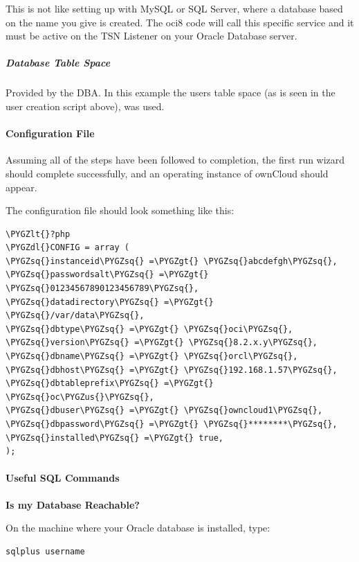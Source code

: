 \documentclass[letterpaper,10pt,english]{sphinxmanual}
\def\PYGZus{\char`\_}
\def\PYGZlt{\char`\<}
\def\PYGZgt{\char`\>}
\def\PYGZdl{\char`\$}
\def\PYGZsq{\char`\'}
\begin{document}
This is not like setting up with MySQL or SQL Server, where a database based on the name you give is created.
The oci8 code will call this specific service and it must be active on the TSN Listener on your Oracle Database server.


\subparagraph{Database Table Space}
\label{enterprise_installation/oracle_db_configuration:database-table-space}
Provided by the DBA.
In this example the users table space (as is seen in the user creation script above), was used.


\paragraph{Configuration File}
\label{enterprise_installation/oracle_db_configuration:configuration-file}
Assuming all of the steps have been followed to completion, the first run wizard should complete successfully, and an operating instance of ownCloud should appear.

The configuration file should look something like this:

\begin{Verbatim}[commandchars=\\\{\}]
\PYGZlt{}?php
\PYGZdl{}CONFIG = array (
\PYGZsq{}instanceid\PYGZsq{} =\PYGZgt{} \PYGZsq{}abcdefgh\PYGZsq{},
\PYGZsq{}passwordsalt\PYGZsq{} =\PYGZgt{} \PYGZsq{}01234567890123456789\PYGZsq{},
\PYGZsq{}datadirectory\PYGZsq{} =\PYGZgt{} \PYGZsq{}/var/data\PYGZsq{},
\PYGZsq{}dbtype\PYGZsq{} =\PYGZgt{} \PYGZsq{}oci\PYGZsq{},
\PYGZsq{}version\PYGZsq{} =\PYGZgt{} \PYGZsq{}8.2.x.y\PYGZsq{},
\PYGZsq{}dbname\PYGZsq{} =\PYGZgt{} \PYGZsq{}orcl\PYGZsq{},
\PYGZsq{}dbhost\PYGZsq{} =\PYGZgt{} \PYGZsq{}192.168.1.57\PYGZsq{},
\PYGZsq{}dbtableprefix\PYGZsq{} =\PYGZgt{} \PYGZsq{}oc\PYGZus{}\PYGZsq{},
\PYGZsq{}dbuser\PYGZsq{} =\PYGZgt{} \PYGZsq{}owncloud1\PYGZsq{},
\PYGZsq{}dbpassword\PYGZsq{} =\PYGZgt{} \PYGZsq{}********\PYGZsq{},
\PYGZsq{}installed\PYGZsq{} =\PYGZgt{} true,
);
\end{Verbatim}


\paragraph{Useful SQL Commands}
\label{enterprise_installation/oracle_db_configuration:useful-sql-commands}
\textbf{Is my Database Reachable?}

On the machine where your Oracle database is installed, type:

\begin{Verbatim}[commandchars=\\\{\}]
sqlplus username
\end{Verbatim}
\end{document}
